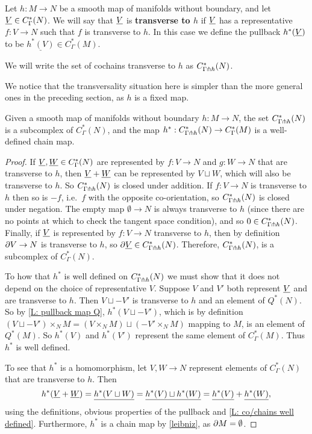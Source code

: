 \begin{definition}\label{D: transverse to map}
Let $h \colon M \to N$ be a smooth map of manifolds without boundary, and let $\underline{V} \in C^*_\Gamma(N)$. We will say that $\underline{V}$ is \textbf{transverse to $h$} if $\underline{V}$ has a representative $f \colon V \to N$ such that $f$ is transverse to $h$. In this case we define the pullback $h^*(\underline{V})$ to be $\underline{h^*(V)} \in C^*_\Gamma(M)$.

We will write the set of cochains transverse to $h$ as $C^*_{\Gamma\pitchfork h}(N)$.
\end{definition}

We notice that the transversality situation here is simpler than the more general ones in the preceding section, as $h$ is a fixed map.

\begin{proposition}
Given a smooth map of manifolds without boundary $h \colon M \to N$, the set $C^*_{\Gamma\pitchfork h}(N)$ is a subcomplex of $C^*_{\Gamma}(N)$, and the map $h^*:C^*_{\Gamma\pitchfork h}(N) \to C^*_{\Gamma}(M)$ is a well-defined chain map.
\end{proposition}
\begin{proof}
If $\underline{V},\underline{W} \in C^*_\Gamma(N)$ are represented by $f \colon V \to N$ and $g \colon W \to N$ that are transverse to $h$, then $\underline{V}+\underline{W}$ can be represented by $V \sqcup W$, which will also be transverse to $h$. So $C^*_{\Gamma\pitchfork h}(N)$ is closed under addition. If $f \colon V \to N$ is transverse to $h$ then so is $-f$, i.e.\ $f$ with the opposite co-orientation, so $C^*_{\Gamma\pitchfork h}(N)$ is closed under negation. The empty map $\emptyset \to N$ is always transverse to $h$ (since there are no points at which to check the tangent space condition), and so $0 \in C^*_{\Gamma\pitchfork h}(N)$. Finally, if $\underline{V}$ is represented by $f \colon V \to N$ transverse to $h$, then by definition $\partial V \to N$ is transverse to $h$, so $\partial \underline{V} \in C^*_{\Gamma\pitchfork h}(N)$. Therefore, $C^*_{\Gamma\pitchfork h}(N)$, is a subcomplex of $C^*_{\Gamma}(N)$.

To how that $h^*$ is well defined on $C^*_{\Gamma\pitchfork h}(N)$ we must show that it does not depend on the choice of representative $V$. Suppose $V$ and $V'$ both represent $\underline{V}$ and are transverse to $h$. Then $V \sqcup -V'$ is transverse to $h$ and an element of $Q^*(N)$. So by \cref{L: pullback map Q}, $h^*(V \sqcup -V')$, which is by definition $(V \sqcup -V') \times_N M = (V \times_N M) \sqcup (-V' \times_N M)$ mapping to $M$, is an element of $Q^*(M)$. So $h^*(V)$ and $h^*(V')$ represent the same element of $C^*_{\Gamma}(M)$. Thus $h^*$ is well defined.

To see that $h^*$ is a homomorphism, let $V,W \to N$ represent elements of $C^*_{\Gamma}(N)$ that are transverse to $h$. Then
$$h^*(\underline{V}+\underline{W}) = \underline{h^*(V \sqcup W)} = \underline{h^*(V) \sqcup h^*(W)} = \underline{h^*(V)}+\underline{h^*(W)},$$
using the definitions, obvious properties of the pullback and \cref{L: co/chains well defined}. Furthermore, $h^*$ is a chain map by \cref{leibniz}, as $\partial M = \emptyset$.
\end{proof}

